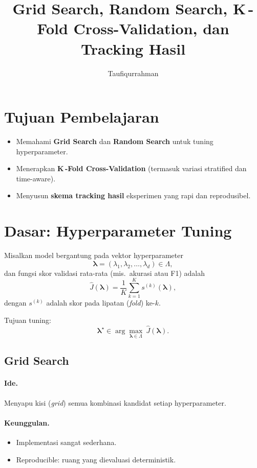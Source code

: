\documentclass[11pt,a4paper]{article}
\title{Grid Search, Random Search, K\,-Fold Cross-Validation, dan Tracking Hasil \\}
\author{Taufiqurrahman}
\date{}
\begin{document}
\maketitle

\section*{Tujuan Pembelajaran}
\begin{itemize}[leftmargin=1.2em]
  \item Memahami \textbf{Grid Search} dan \textbf{Random Search} untuk tuning hyperparameter.
  \item Menerapkan \textbf{K\,-Fold Cross-Validation} (termasuk variasi stratified dan time-aware).
  \item Menyusun \textbf{skema tracking hasil} eksperimen yang rapi dan reprodusibel.
\end{itemize}

\section{Dasar: Hyperparameter Tuning}
Misalkan model bergantung pada vektor hyperparameter
\[
\boldsymbol{\lambda} = (\lambda_1,\lambda_2,\dots,\lambda_d)\in\Lambda,
\]
dan fungsi skor validasi rata-rata (mis.\ akurasi atau F1) adalah
\[
\hat{J}(\boldsymbol{\lambda}) = \frac{1}{K}\sum_{k=1}^{K} s^{(k)}(\boldsymbol{\lambda}),
\]
dengan $s^{(k)}$ adalah skor pada lipatan (\emph{fold}) ke-$k$.

Tujuan tuning:
\[
\boldsymbol{\lambda}^\star \in \arg\max_{\boldsymbol{\lambda}\in\Lambda}\ \hat{J}(\boldsymbol{\lambda}).
\]

\subsection{Grid Search}
\paragraph{Ide.} Menyapu kisi (\emph{grid}) semua kombinasi kandidat setiap hyperparameter.

\paragraph{Keunggulan.}
\begin{itemize}[leftmargin=1.2em]
  \item Implementasi sangat sederhana.
  \item Reproducible: ruang yang dievaluasi deterministik.
\end{itemize}
\end{document}
